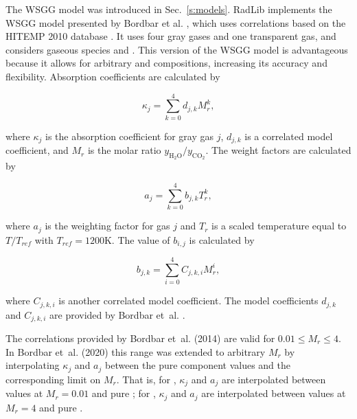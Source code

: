 \documentclass[preprint,12pt, a4paper]{elsarticle}
\begin{document}
The WSGG model was introduced in Sec.~\ref{s:models}.
RadLib implements the WSGG model presented by Bordbar et al. \citep{Bordbar_2014,Bordbar_2020}, which uses correlations based on the HITEMP 2010 database \cite{Rothman_2010}. It uses four gray gases and one transparent gas, and considers gaseous species  and . This version of the WSGG model is advantageous because it allows for arbitrary  and  compositions, increasing its accuracy and flexibility. Absorption coefficients are calculated by 
%
\begin{linenomath}
\begin{equation}
    \kappa_j=\sum_{k=0}^{4}d_{j,k}M_r^k,
\end{equation}
\end{linenomath}
%
where $\kappa_j$ is the absorption coefficient for gray gas $j$, $d_{j,k}$ is a correlated model coefficient, and $M_r$ is the molar ratio $y_{\mathrm{H_2O}}/y_{\mathrm{CO_2}}$. The weight factors are calculated by 
%
\begin{linenomath}
\begin{equation}
    a_j=\sum_{k=0}^{4}b_{j,k}T_r^k,
\end{equation}
\end{linenomath}
%
where $a_j$ is the weighting factor for gas $j$ and $T_r$ is a scaled temperature equal to $T/T_{ref}$ with $T_{ref}=1200$K. The value of $b_{i,j}$ is calculated by 
%
\begin{linenomath}
\begin{equation}
 b_{j,k}=\sum_{i=0}^{4}C_{j,k,i}M_r^i,
\end{equation}
\end{linenomath}
%
where $C_{j,k,i}$ is another correlated model coefficient. The model coefficients $d_{j,k}$ and $C_{j,k,i}$ are provided by Bordbar et~al. \citep{Bordbar_2014,Bordbar_2020}. 

The correlations provided by Bordbar et~al. (2014) \cite{Bordbar_2014} are valid for $0.01\le M_r\le4$. In Bordbar et~al. (2020) \cite{Bordbar_2020} this range was extended to arbitrary $M_r$ by interpolating $\kappa_j$ and $a_j$ between the pure component values and the corresponding limit on $M_r$. That is, for , $\kappa_j$ and $a_j$ are interpolated between values at $M_r=0.01$ and pure ; for , $\kappa_j$ and $a_j$ are interpolated between values at $M_r=4$ and pure .

\end{document}
